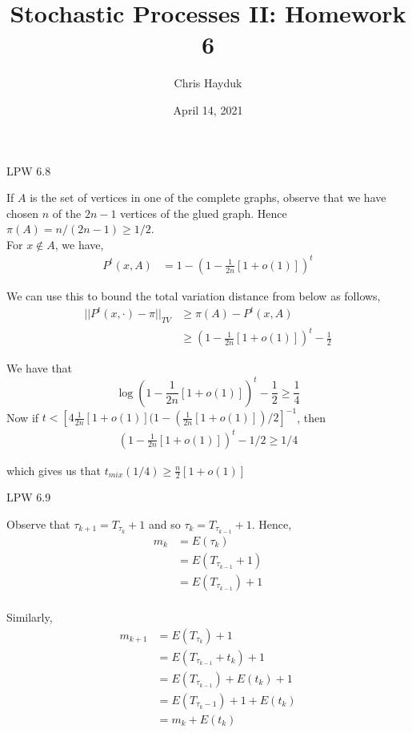 \documentclass[12pt]{article}
\newenvironment{problem}[2][Problem]{\begin{trivlist}
\item[\hskip \labelsep {\bfseries #1}\hskip \labelsep {\bfseries #2.}]}{\end{trivlist}}
\begin{document}
\title{Stochastic Processes II: Homework 6}

\author{Chris Hayduk}
\date{April 14, 2021}

\maketitle

\begin{problem}{I}
LPW 6.8
\end{problem}

If $A$ is the set of vertices in one of the complete graphs, observe that we have chosen $n$ of the $2n-1$ vertices of the glued graph. Hence $\pi(A) = n/(2n-1) \geq 1/2$.\\

For $x \not\in A$, we have,
\begin{align*}
P^t(x, A) &= 1 - \left(1 - \frac{1}{2n}[1 + o(1)]\right)^t
\end{align*}

We can use this to bound the total variation distance from below as follows,
\begin{align*}
||P^t(x, \cdot) - \pi||_{TV} &\geq \pi(A) - P^t(x, A)\\
&\geq (1 -  \frac{1}{2n}[1 + o(1)])^t - \frac{1}{2}
\end{align*}

We have that $$\log(1 - \frac{1}{2n}[1 + o(1)])^t - \frac{1}{2} \geq \frac{1}{4}$$ Now if $t < [4\frac{1}{2n}[1 + o(1)](1 - (\frac{1}{2n}[1 + o(1)])/2]^{-1}$, then
\begin{align*}
(1 - \frac{1}{2n}[1 + o(1)])^t - 1/2 \geq 1/4
\end{align*}

which gives us that $t_{mix}(1/4) \geq \frac{n}{2}[1 + o(1)]$


\begin{problem}{II}
LPW 6.9
\end{problem}

Observe that $\tau_{k+1} = T_{\tau_k} + 1$ and so $\tau_k = T_{\tau_{k-1}} + 1$. Hence,
\begin{align*}
m_k &= E(\tau_k)\\
&= E(T_{\tau_{k-1}} + 1)\\
&= E(T_{\tau_{k-1}}) + 1\\
\end{align*}

Similarly,
\begin{align*}
m_{k+1} &= E(T_{\tau_k}) + 1\\
&= E(T_{\tau_{k-1}} + t_k) + 1\\
&= E(T_{\tau_{k-1}}) + E(t_k) + 1\\
&= E(T_{\tau_k -1}) + 1 + E(t_k)\\
&= m_k + E(t_k)
\end{align*}
\end{document}
